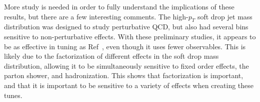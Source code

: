 More study is needed in order to fully understand the implications of these results, but there are a few interesting comments. 
The high-$p_T$ soft drop jet mass distribution was designed to study perturbative QCD, but also had several bins sensitive to non-perturbative effects. 
With these preliminary studies, it appears to be as effective in tuning as Ref~\cite{jssObs}, even though it uses fewer observables. 
This is likely due to the factorization of different effects in the soft drop mass distribution, allowing it to be simultaneously sensitive to fixed order effects, the parton shower, and hadronization. 
This shows that factorization is important, and that it is important to be sensitive to a variety of effects when creating these tunes.







